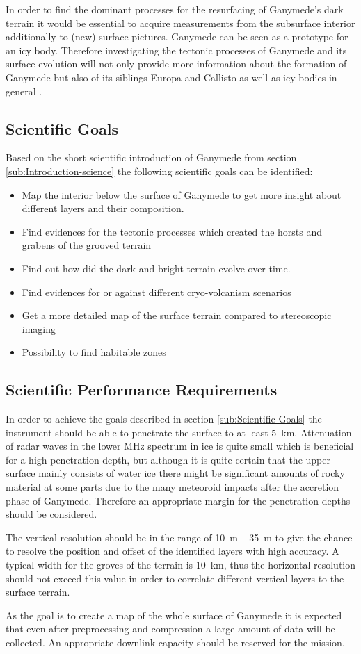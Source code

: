 In order to find the dominant processes for the resurfacing of Ganymede's
dark terrain it would be essential to acquire measurements from the
subsurface interior additionally to (new) surface pictures. Ganymede
can be seen as a prototype for an icy body. Therefore investigating
the tectonic processes of Ganymede and its surface evolution will
not only provide more information about the formation of Ganymede
but also of its siblings Europa and Callisto as well as icy bodies
in general \cite{bagenal2007jupiter}.


\subsection{Scientific Goals\label{sub:Scientific-Goals}}

Based on the short scientific introduction of Ganymede from section
\ref{sub:Introduction-science} the following scientific goals can
be identified:
\begin{itemize}
\item Map the interior below the surface of Ganymede to get more insight
about different layers and their composition. 
\item Find evidences for the tectonic processes which created the horsts
and grabens of the grooved terrain
\item Find out how did the dark and bright terrain evolve over time.
\item Find evidences for or against different cryo-volcanism scenarios
\item Get a more detailed map of the surface terrain compared to stereoscopic
imaging
\item Possibility to find habitable zones 
\end{itemize}

\subsection{Scientific Performance Requirements}

In order to achieve the goals described in section \ref{sub:Scientific-Goals}
the instrument should be able to penetrate the surface to at least
5~km. Attenuation of radar waves in the lower MHz spectrum in ice
is quite small which is beneficial for a high penetration depth, but
although it is quite certain that the upper surface mainly consists
of water ice there might be significant amounts of rocky material
at some parts due to the many meteoroid impacts after the accretion
phase of Ganymede. Therefore an appropriate margin for the penetration
depths should be considered. 

The vertical resolution should be in the range of 10~m -- 35~m to
give the chance to resolve the position and offset of the identified
layers with high accuracy. A typical width for the groves of the terrain
is 10~km, thus the horizontal resolution should not exceed this value
in order to correlate different vertical layers to the surface terrain. 

As the goal is to create a map of the whole surface of Ganymede it
is expected that even after preprocessing and compression a large
amount of data will be collected. An appropriate downlink capacity
should be reserved for the mission.

